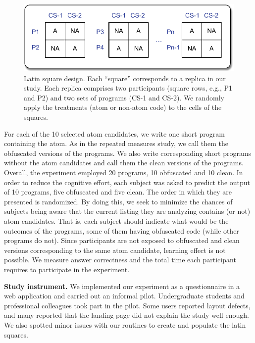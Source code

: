   \begin{figure}[htb!]
      \noindent
      \centering
      \includegraphics[scale=.50]{images/latin-square.pdf}
      \caption{Latin square design. Each ``square'' corresponds to 
      a replica in our study. Each replica comprises two participants (square rows, e.g., P1 and P2) 
      and two sets of programs (CS-1 and CS-2). We randomly apply the 
      treatments (atom or non-atom code) to the cells of the squares.} 
      \label{fig:latinsquare}
  \end{figure}

For each of the 10 selected atom candidates, we write one short program containing the atom. As in the repeated measures study, we call them the obfuscated versions of the programs. We also write corresponding short programs without the atom candidates and call them the clean versions of the programs. Overall, the experiment employed 20 programs, 10 obfuscated and 10 clean. In order to reduce the cognitive effort, each subject was asked to predict the output of 10 programs, five obfuscated and five clean. The order in which they are presented is randomized. By doing this, we seek to minimize the chances of subjects being aware that the current listing they are analyzing contains (or not) atom candidates. That is, each subject should indicate what would be the outcomes of the programs, some of them having obfuscated code (while other programs do not). Since participants are not exposed to obfuscated and clean versions corresponding to the same atom candidate, learning effect is not possible. We measure answer correctness and the total time each participant requires to participate in the experiment.

{\bf Study instrument.} 
We implemented our experiment as a questionnaire in a web application and 
carried out an informal pilot. Undergraduate students and professional colleagues took part in the pilot. Some users reported layout defects, and many reported that the landing page did not explain the study well enough. We also spotted minor issues with our routines to create and populate the latin squares. 

